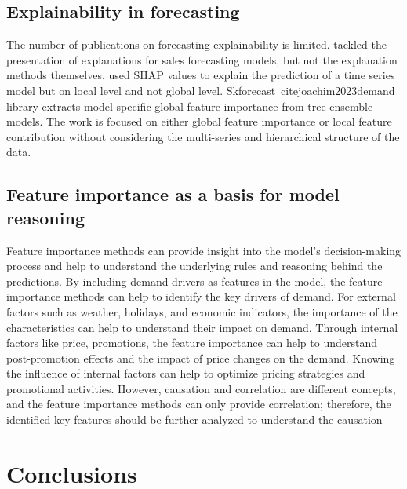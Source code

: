 \subsection{Explainability in forecasting}\label{subsec:explainability-in-forecasting}
The number of publications on forecasting explainability is limited.
\cite{fahse2022explanation} tackled the presentation of explanations for sales forecasting models, but not the explanation methods themselves.
\cite{Saluja_2021} used SHAP values to explain the prediction of a time series model but on local level and not global level.
Skforecast~cite{joachim2023demand} library extracts model specific global feature importance from tree ensemble models.
The work is focused on either global feature importance or local feature contribution without considering the multi-series and hierarchical structure of the data.

\subsection{Feature importance as a basis for model reasoning}\label{subsec:feature-importance-as-basis-for-model-reasoning}
Feature importance methods can provide insight into the model's decision-making process and help to understand the underlying rules and reasoning behind the predictions.
By including demand drivers as features in the model, the feature importance methods can help to identify the key drivers of demand.
For external factors such as weather, holidays, and economic indicators, the importance of the characteristics can help to understand their impact on demand.
Through internal factors like price, promotions, the feature importance can help to understand post-promotion effects and the impact of price changes on the demand\cite{vandeput2023demand}.
Knowing the influence of internal factors can help to optimize pricing strategies and promotional activities.
However, causation and correlation are different concepts, and the feature importance methods can only provide correlation;
therefore, the identified key features should be further analyzed to understand the causation\cite{Breiman2001}





\section{Conclusions}
\label{sec:interpretability_explainability_conclusions}
